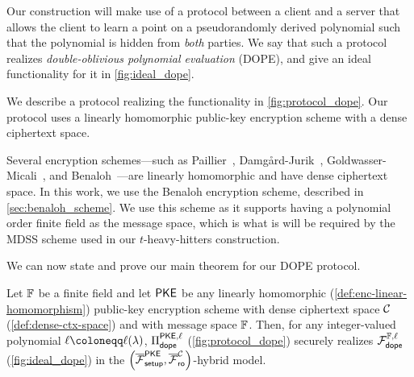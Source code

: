 Our construction will make use of a protocol between a client and a server that allows the client to learn a point on a pseudorandomly derived polynomial such that the polynomial is hidden from \emph{both} parties.
We say that such a protocol realizes \emph{double-oblivious polynomial evaluation} (DOPE), and give an ideal functionality for it in
\cref{fig:ideal_dope}.




We describe a protocol realizing the functionality in \cref{fig:protocol_dope}.
Our protocol uses a linearly homomorphic public-key encryption scheme with a dense ciphertext space.

Several encryption schemes---such as Paillier~\autocite{EC:Paillier99}, Damg\aa{}rd-Jurik~\autocite{PKC:DamJur01}, Goldwasser-Micali~\autocite{STOC:GolMic82}, and Benaloh~\autocite{SAC:Ben94}---are linearly homomorphic and have dense ciphertext space.
In this work, we use the Benaloh encryption scheme, described in \cref{sec:benaloh_scheme}.
We use this scheme as it supports having a polynomial order finite field as the message space, which is what is will be required by the MDSS scheme used in our $t$-heavy-hitters construction.



We can now state and prove our main theorem for our DOPE protocol.
\begin{theorem}\label{lemma:dope}
	Let $\field$ be a finite field and let $\encscheme$ be any linearly homomorphic (\cref{def:enc-linear-homomorphism}) public-key encryption scheme with dense ciphertext space $\ctxspace$ (\cref{def:dense-ctx-space}) and with message space $\field$.
	Then, for any integer-valued polynomial $\ell \coloneqq \ell(\secpar)$, $\pdope[\ell]$ (\cref{fig:protocol_dope}) securely realizes $\fdope[\ell]$ (\cref{fig:ideal_dope}) in the $\parens{\fsetup^{\encscheme}, \frandoracle^\ctxspace}$-hybrid model.
\end{theorem}

